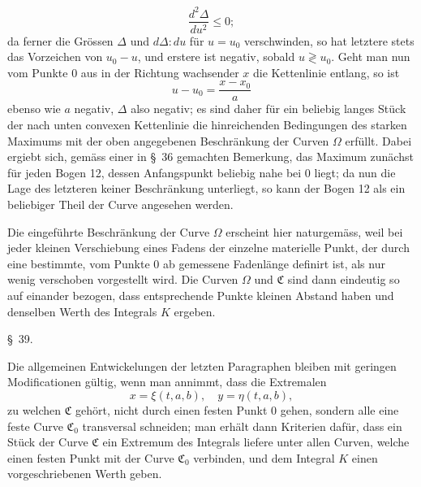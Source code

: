\documentclass[11pt,a4paper,leqno]{article}
\begin{document}
\[
\frac{d^2\Delta}{du^2}\leq0;
\]
da ferner die Grössen $\Delta$ und $d\Delta:du$ für $u=u_0$ verschwinden, so hat letztere stets das Vorzeichen von $u_0-u$, und erstere ist negativ, sobald $u\gtrless u_0$. Geht man nun vom Punkte 0 aus in der Richtung wachsender $x$ die Kettenlinie entlang, so ist
\[
u-u_0=\frac{x-x_0}{a}
\]
ebenso wie $a$ negativ, $\Delta$ also negativ; es sind daher für ein beliebig langes Stück der nach unten convexen Kettenlinie die hinreichenden Bedingungen des starken Maximums mit der oben angegebenen Beschränkung der Curven $\Omega$ erfüllt. Dabei ergiebt sich, gemäss einer in \S~36 gemachten Bemerkung, das Maximum zunächst für jeden Bogen 12, dessen Anfangspunkt beliebig nahe bei 0 liegt; da nun die Lage des letzteren keiner Beschränkung unterliegt, so kann der Bogen 12 als ein beliebiger Theil der Curve angesehen werden.

Die eingeführte Beschränkung der Curve $\Omega$ erscheint hier naturgemäss, weil bei jeder kleinen Verschiebung eines Fadens der einzelne materielle Punkt, der durch eine bestimmte, vom Punkte 0 ab gemessene Fadenlänge definirt ist, als nur wenig verschoben vorgestellt wird. Die Curven $\Omega$ und $\mathfrak{C}$ sind dann eindeutig so auf einander bezogen, dass entsprechende Punkte kleinen Abstand haben und denselben Werth des Integrals $K$ ergeben.

\begin{center}
{\large \S~39.}
\end{center}

Die allgemeinen Entwickelungen der letzten Paragraphen bleiben mit geringen Modificationen gültig, wenn man annimmt, dass die Extremalen
\begin{equation}\tag{24}
x=\xi(t,a,b),\quad y=\eta(t,a,b),
\end{equation}
zu welchen $\mathfrak{C}$ gehört, nicht durch einen festen Punkt 0 gehen, sondern alle eine feste Curve $\mathfrak{C}_0$ transversal schneiden; man erhält dann Kriterien dafür, dass ein Stück der Curve $\mathfrak{C}$ ein Extremum des Integrals liefere unter allen Curven, welche einen festen Punkt mit der Curve $\mathfrak{C}_0$ verbinden, und dem Integral $K$ einen vorgeschriebenen Werth geben.
\end{document}
